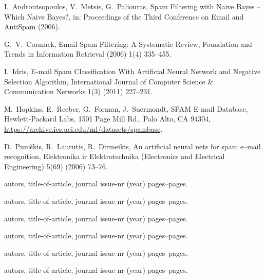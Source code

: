 \documentclass[11pt,a4paper]{article}
\begin{document}
\begin{thebibliography}{99}
\begin{small}
  I.\ Androutsopoulos, V.\ Metsis, G.\ Paliouras,
  Spam Filtering with Naive Bayes -- Which Naive Bayes?,
  in: Proceedings of the Third Conference on Email and AntiSpam (2006).

  G.\ V.\ Cormack, 
  Email Spam Filtering: A Systematic Review,
  Foundation and Trends in Information Retrieval (2006) 1(4) 335--455.

  I.\ Idris, 
  E-mail Spam Classification With Artificial Neural Network and Negative Selection Algorithm,
   International Journal of Computer Science \& Communication Networks 1(3) (2011) 227--231.

  M.\ Hopkins, E.\ Reeber, G.\ Forman, J.\ Suermondt, 
  SPAM E-mail Database,
  Hewlett-Packard Labs, 1501 Page Mill Rd., Palo Alto, CA 94304,
  \url{https://archive.ics.uci.edu/ml/datasets/spambase}.

  D.\ Puni\v skis, R.\ Laurutis, R.\ Dirmeikis,
  An artificial neural nets for spam e–mail recognition,
  Elektronika ir Elektrotechnika (Electronics and Electrical Engineering) 5(69) (2006) 73--76.

  autors, 
  title-of-article,
  journal issue-nr (year) pages--pages.


  autors, 
  title-of-article,
  journal issue-nr (year) pages--pages.

 
  autors, 
  title-of-article,
  journal issue-nr (year) pages--pages.


        
        
  autors, 
  title-of-article,
  journal issue-nr (year) pages--pages.

  autors, 
  title-of-article,
  journal issue-nr (year) pages--pages.


  autors, 
  title-of-article,
  journal issue-nr (year) pages--pages.
\end{small}
\end{thebibliography}
\end{document}
